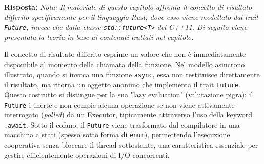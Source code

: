 \textbf{Risposta:}
\textit{Nota: Il materiale di questo capitolo affronta il concetto di risultato differito specificamente per il linguaggio Rust, dove esso viene modellato dal trait \texttt{Future}, invece che dalla classe \texttt{std::future<T>} del C++11. Di seguito viene presentata la teoria in base ai contenuti trattati nel capitolo.}

Il concetto di risultato differito esprime un valore che non è immediatamente disponibile al momento della chiamata della funzione. Nel modello asincrono illustrato, quando si invoca una funzione \texttt{async}, essa non restituisce direttamente il risultato, ma ritorna un oggetto anonimo che implementa il trait \texttt{Future}. Questo costrutto si distingue per la sua "lazy evaluation" (valutazione pigra): il \texttt{Future} è inerte e non compie alcuna operazione se non viene attivamente interrogato (\textit{polled}) da un Executor, tipicamente attraverso l'uso della keyword \texttt{.await}. Sotto il cofano, il \texttt{Future} viene trasformato dal compilatore in una macchina a stati (spesso sotto forma di \texttt{enum}), permettendo l'esecuzione cooperativa senza bloccare il thread sottostante, una caratteristica essenziale per gestire efficientemente operazioni di I/O concorrenti.
